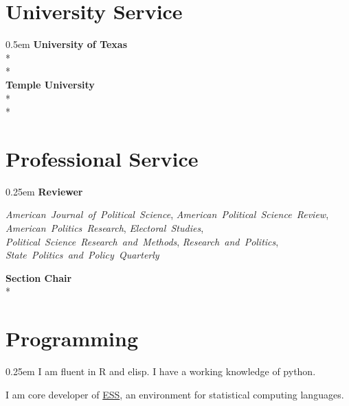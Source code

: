 \documentclass[article,11pt,oneside,letterpaper]{memoir}
\begin{document}
\section{University Service}{0.5em}
\textbf{University of Texas} \\*
 \\*
\\
\textbf{Temple University}\\*
 \\*
\\
\vspace{-1em}

\section{Professional Service}{0.25em}
\textbf{Reviewer}
\begin{adjustwidth}{\widthof{\hphantom{xyz}}}{}
  \begin{flushleft}
    \emph{American~Journal~of~Political~Science},
    \emph{American~Political~Science~Review},
    \emph{American~Politics~Research},
    \emph{Electoral~Studies},
    \emph{Political~Science~Research~and~Methods},
    \emph{Research~and~Politics},
    \emph{State~Politics~and~Policy~Quarterly}
  \end{flushleft}
\end{adjustwidth}

\textbf{Section Chair}\\*

\section{Programming}{0.25em}
I am fluent in R and elisp. I have a working knowledge of python.

I am core developer of \href{https://ess.r-project.org}{ESS}, an environment for statistical computing languages.

\thispagestyle{lastpage}
\end{document}
